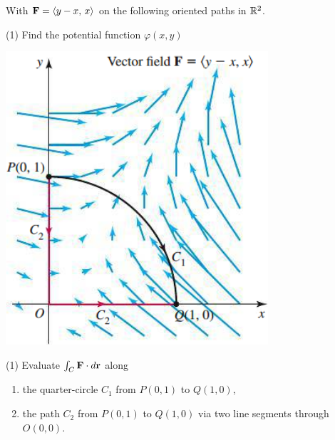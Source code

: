 \documentclass[../mathNotesPreamble]{subfiles}
\begin{document}
  \begin{ex*}
     With $\mathbf F={\left\langle y-x,\,x \right\rangle}$ on the following oriented paths in $\mathbb{R}^2$.
  \end{ex*}
  \vspace*{-\baselineskip}
  \noindent
  \begin{minipage}[t]{0.6\linewidth}\mbox{}
    \begin{tasks}[after-item-skip=8\baselineskip, label=\alph*)](1)
      \task 
        Find the potential function $\varphi(x,y)$
    \end{tasks}
  \end{minipage}
  \begin{minipage}[t]{0.4\linewidth}\mbox{}
    \begin{flushright}
      \includegraphics[width=0.75\linewidth]{../images/briggs_17_02/fig17_20}
    \end{flushright}
  \end{minipage}
  \begin{tasks}[after-item-skip=\stretch{1}, label=\alph*), resume](1)
    \task 
      Evaluate $\int_C \mathbf F\cdot d{\mathbf{r}}$ along
      \begin{enumerate}[itemsep=6\baselineskip, label=]
        \item 
          the quarter-circle $C_1$ from $P(0,1)$ to $Q(1,0)$,
        \item 
          the path $C_2$ from $P(0,1)$ to $Q(1,0)$ via two line segments through $O(0,0)$.
      \end{enumerate}
  \end{tasks}
  \pagebreak
\end{document}
